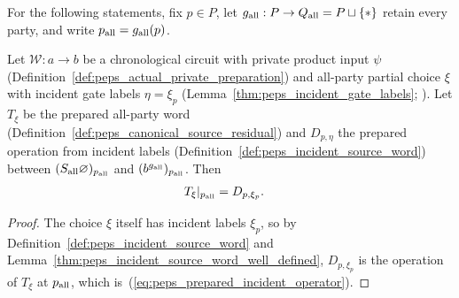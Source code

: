 For the following statements, fix $p\in P$, let $g_{\rm all}:P\to Q_{\rm all}=P\sqcup\{*\}$
retain every party, and write $p_{\rm all}=g_{\rm all}(p)$.

\begin{lemma}
    \label{thm:peps_prepared_incident_operator}
    \leanok
    Let $\mathcal W:a\to b$ be a chronological circuit with private product
    input $\psi$ (Definition~\ref{def:peps_actual_private_preparation}) and
    all-party partial choice $\xi$ with incident gate labels $\eta=\xi_p$
    (Lemma~\ref{thm:peps_incident_gate_labels};
    \cite[proof of Theorem~5.2]{OpenAI2026PolynomialPEPS}). Let $T_\xi$ be the
    prepared all-party word (Definition~\ref{def:peps_canonical_source_residual})
    and $D_{p,\eta}$ the prepared operation from incident labels
    (Definition~\ref{def:peps_incident_source_word}) between
    $(S_{\rm all}\varnothing)_{p_{\rm all}}$ and $(b^{g_{\rm all}})_{p_{\rm all}}$.
    Then
    \begin{align}
        T_\xi|_{p_{\rm all}} & =D_{p,\xi_p}.
        \label{eq:peps_prepared_incident_operator}
    \end{align}
\end{lemma}

\begin{proof}
    \leanok
    The choice $\xi$ itself has incident labels $\xi_p$, so by
    Definition~\ref{def:peps_incident_source_word} and
    Lemma~\ref{thm:peps_incident_source_word_well_defined}, $D_{p,\xi_p}$ is
    the operation of $T_\xi$ at $p_{\rm all}$, which
    is~(\ref{eq:peps_prepared_incident_operator}).
\end{proof}

